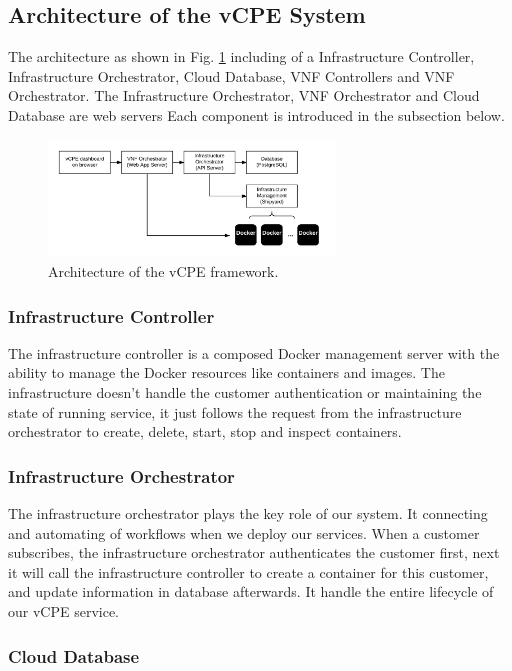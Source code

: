 \documentclass[journal]{IEEEtran}
\begin{document}
\subsection{Architecture of the vCPE System}
The architecture as shown in Fig. \ref{fig:desc_vcpe_framework} including of a Infrastructure Controller, Infrastructure Orchestrator, Cloud Database, VNF Controllers and VNF Orchestrator.
The Infrastructure Orchestrator, VNF Orchestrator and Cloud Database are web servers
Each component is introduced in the subsection below.

\begin{figure}[!t]
\centering
\includegraphics[width=3in]{./figures/desc_vcpe_framework}
\caption{Architecture of the vCPE framework.}
\label{fig:desc_vcpe_framework}
\end{figure}

\subsubsection{Infrastructure Controller}

The infrastructure controller is a composed Docker management server with the ability to manage the Docker resources like containers and images. The infrastructure doesn't handle the customer authentication or maintaining the state of running service, it just follows the request from the infrastructure orchestrator to create, delete, start, stop and inspect containers.

\subsubsection{Infrastructure Orchestrator}

The infrastructure orchestrator plays the key role of our system. It connecting and automating of workflows when we deploy our services. When a customer subscribes, the infrastructure orchestrator authenticates the customer first, next it will call the infrastructure controller to create a container for this customer, and update information in database afterwards. It handle the entire lifecycle of our vCPE service.

\subsubsection{Cloud Database}
\end{document}
